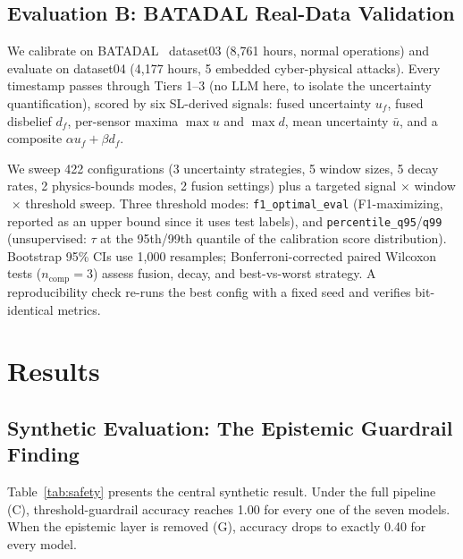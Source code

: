 \documentclass[conference]{IEEEtran}
\begin{document}
\subsection{Evaluation B: BATADAL Real-Data Validation}

We calibrate on BATADAL~\cite{taormina2018battle} dataset03 (8{,}761 hours, normal operations) and evaluate on dataset04 (4{,}177 hours, 5 embedded cyber-physical attacks). Every timestamp passes through Tiers 1--3 (no LLM here, to isolate the uncertainty quantification), scored by six SL-derived signals: fused uncertainty $u_f$, fused disbelief $d_f$, per-sensor maxima $\max u$ and $\max d$, mean uncertainty $\bar{u}$, and a composite $\alpha u_f + \beta d_f$.

We sweep 422 configurations (3 uncertainty strategies, 5 window sizes, 5 decay rates, 2 physics-bounds modes, 2 fusion settings) plus a targeted signal$\,\times\,$window$\,\times\,$threshold sweep. Three threshold modes: \texttt{f1\_optimal\_eval} (F1-maximizing, reported as an upper bound since it uses test labels), and \texttt{percentile\_q95}/\texttt{q99} (unsupervised: $\tau$ at the 95th/99th quantile of the calibration score distribution). Bootstrap 95\% CIs use 1{,}000 resamples; Bonferroni-corrected paired Wilcoxon tests ($n_{\text{comp}}=3$) assess fusion, decay, and best-vs-worst strategy. A reproducibility check re-runs the best config with a fixed seed and verifies bit-identical metrics.

\section{Results}
\label{sec:results}

\subsection{Synthetic Evaluation: The Epistemic Guardrail Finding}

Table~\ref{tab:safety} presents the central synthetic result. Under the full pipeline (C), threshold-guardrail accuracy reaches 1.00 for every one of the seven models. When the epistemic layer is removed (G), accuracy drops to exactly 0.40 for every model.
\end{document}
